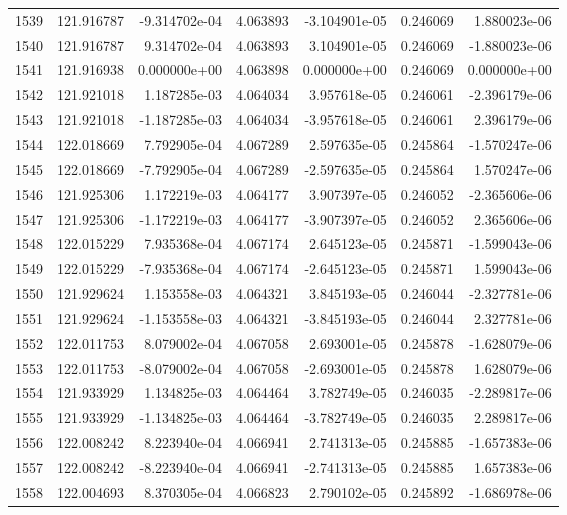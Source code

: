 \begin{tabular}{rrrrrrr}
1539 & 121.916787 & -9.314702e-04 &  4.063893 & -3.104901e-05 &    0.246069 &  1.880023e-06 \\
1540 & 121.916787 &  9.314702e-04 &  4.063893 &  3.104901e-05 &    0.246069 & -1.880023e-06 \\
1541 & 121.916938 &  0.000000e+00 &  4.063898 &  0.000000e+00 &    0.246069 &  0.000000e+00 \\
1542 & 121.921018 &  1.187285e-03 &  4.064034 &  3.957618e-05 &    0.246061 & -2.396179e-06 \\
1543 & 121.921018 & -1.187285e-03 &  4.064034 & -3.957618e-05 &    0.246061 &  2.396179e-06 \\
1544 & 122.018669 &  7.792905e-04 &  4.067289 &  2.597635e-05 &    0.245864 & -1.570247e-06 \\
1545 & 122.018669 & -7.792905e-04 &  4.067289 & -2.597635e-05 &    0.245864 &  1.570247e-06 \\
1546 & 121.925306 &  1.172219e-03 &  4.064177 &  3.907397e-05 &    0.246052 & -2.365606e-06 \\
1547 & 121.925306 & -1.172219e-03 &  4.064177 & -3.907397e-05 &    0.246052 &  2.365606e-06 \\
1548 & 122.015229 &  7.935368e-04 &  4.067174 &  2.645123e-05 &    0.245871 & -1.599043e-06 \\
1549 & 122.015229 & -7.935368e-04 &  4.067174 & -2.645123e-05 &    0.245871 &  1.599043e-06 \\
1550 & 121.929624 &  1.153558e-03 &  4.064321 &  3.845193e-05 &    0.246044 & -2.327781e-06 \\
1551 & 121.929624 & -1.153558e-03 &  4.064321 & -3.845193e-05 &    0.246044 &  2.327781e-06 \\
1552 & 122.011753 &  8.079002e-04 &  4.067058 &  2.693001e-05 &    0.245878 & -1.628079e-06 \\
1553 & 122.011753 & -8.079002e-04 &  4.067058 & -2.693001e-05 &    0.245878 &  1.628079e-06 \\
1554 & 121.933929 &  1.134825e-03 &  4.064464 &  3.782749e-05 &    0.246035 & -2.289817e-06 \\
1555 & 121.933929 & -1.134825e-03 &  4.064464 & -3.782749e-05 &    0.246035 &  2.289817e-06 \\
1556 & 122.008242 &  8.223940e-04 &  4.066941 &  2.741313e-05 &    0.245885 & -1.657383e-06 \\
1557 & 122.008242 & -8.223940e-04 &  4.066941 & -2.741313e-05 &    0.245885 &  1.657383e-06 \\
1558 & 122.004693 &  8.370305e-04 &  4.066823 &  2.790102e-05 &    0.245892 & -1.686978e-06 \\

\end{tabular}
